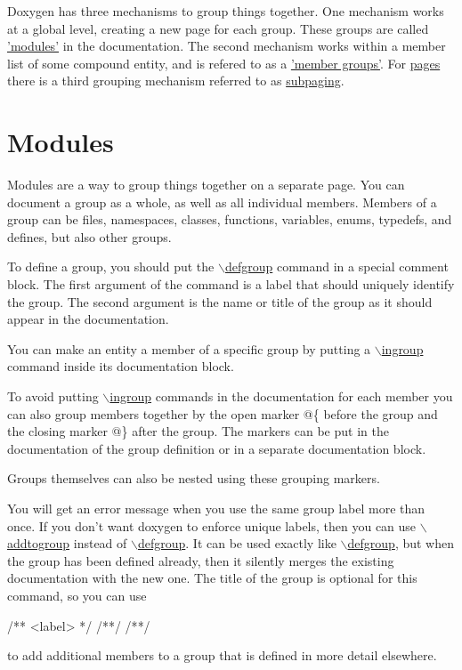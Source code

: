 Doxygen has three mechanisms to group things together. One mechanism works at a global level, creating a new page for each group. These groups are called \hyperlink{grouping_modules}{'modules'} in the documentation. The second mechanism works within a member list of some compound entity, and is refered to as a \hyperlink{grouping_memgroup}{'member groups'}. For \hyperlink{commands_cmdpage}{pages} there is a third grouping mechanism referred to as \hyperlink{grouping_subpaging}{subpaging}.\hypertarget{grouping_modules}{}\section{Modules}\label{grouping_modules}
Modules are a way to group things together on a separate page. You can document a group as a whole, as well as all individual members. Members of a group can be files, namespaces, classes, functions, variables, enums, typedefs, and defines, but also other groups.

To define a group, you should put the \hyperlink{commands_cmddefgroup}{$\backslash$defgroup} command in a special comment block. The first argument of the command is a label that should uniquely identify the group. The second argument is the name or title of the group as it should appear in the documentation.

You can make an entity a member of a specific group by putting a \hyperlink{commands_cmdingroup}{$\backslash$ingroup} command inside its documentation block.

To avoid putting \hyperlink{commands_cmdingroup}{$\backslash$ingroup} commands in the documentation for each member you can also group members together by the open marker {\ttfamily @\{} before the group and the closing marker {\ttfamily @\}} after the group. The markers can be put in the documentation of the group definition or in a separate documentation block.

Groups themselves can also be nested using these grouping markers.

You will get an error message when you use the same group label more than once. If you don't want doxygen to enforce unique labels, then you can use \hyperlink{commands_cmdaddtogroup}{$\backslash$addtogroup} instead of \hyperlink{commands_cmddefgroup}{$\backslash$defgroup}. It can be used exactly like \hyperlink{commands_cmddefgroup}{$\backslash$defgroup}, but when the group has been defined already, then it silently merges the existing documentation with the new one. The title of the group is optional for this command, so you can use \begin{DoxyVerb}
/** \addtogroup <label> */
/*\@{*/
/*\@}*/
\end{DoxyVerb}
 to add additional members to a group that is defined in more detail elsewhere.

